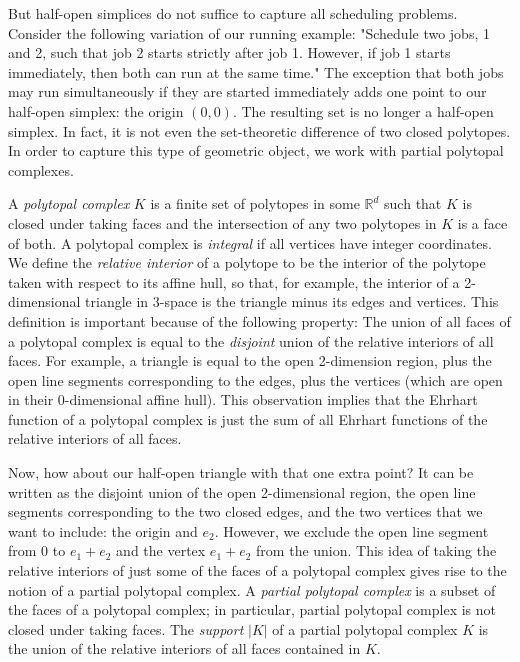 \documentclass[12pt,reqno]{amsart}
\numberwithin{definition}{section}
\theoremstyle{definition}
\newcommand{\RR}{\mathbb{R}}
\begin{document}
But half-open simplices do not suffice to capture all scheduling problems. Consider the following variation of our running example: "Schedule two jobs, 1 and 2, such that job 2 starts strictly after job 1. However, if job 1 starts immediately, then both can run at the same time." The exception that both jobs may run simultaneously if they are started immediately adds one point to our half-open simplex: the origin $(0,0)$. The resulting set is no longer a half-open simplex. In fact, it is not even the set-theoretic difference of two closed polytopes. In order to capture this type of geometric object, we work with partial polytopal complexes.

A \emph{polytopal complex} $K$ is a finite set of polytopes in some $\RR^d$ such that $K$ is closed under taking faces and the intersection of any two polytopes in $K$ is a face of both. A polytopal complex is \emph{integral} if all vertices have integer coordinates. We define the \emph{relative interior} of a polytope to be the interior of the polytope taken with respect to its affine hull, so that, for example, the interior of a 2-dimensional triangle in 3-space is the triangle minus its edges and vertices. This definition is important because of the following property: The union of all faces of a polytopal complex is equal to the \emph{disjoint} union of the relative interiors of all faces. For example, a triangle is equal to the open 2-dimension region, plus the open line segments corresponding to the edges, plus the vertices (which are open in their 0-dimensional affine hull). This observation implies that the Ehrhart function of a polytopal complex is just the sum of all Ehrhart functions of the relative interiors of all faces.

Now, how about our half-open triangle with that one extra point? It can be written as the disjoint union of the open 2-dimensional region, the open line segments corresponding to the two closed edges, and the two vertices that we want to include: the origin and $e_2$. However, we exclude the open line segment from 0 to $e_1+e_2$ and the vertex $e_1+e_2$ from the union. This idea of taking the relative interiors of just some of the faces of a polytopal complex gives rise to the notion of a partial polytopal complex. A \emph{partial polytopal complex} is a subset of the faces of a polytopal complex; in particular, partial polytopal complex is not closed under taking faces. The \emph{support} $|K|$ of a partial polytopal complex $K$ is the union of the relative interiors of all faces contained in $K$.
\end{document}
